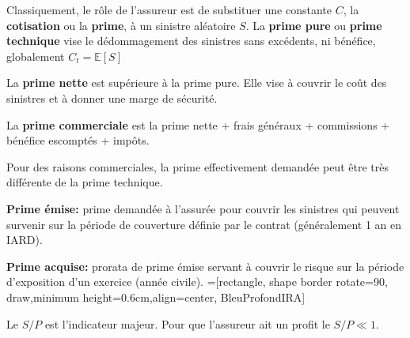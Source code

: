 \begin{f}
Classiquement, le rôle de l'assureur est de substituer une constante \(C\), la \textbf{cotisation} ou la \textbf{prime}, à un sinistre aléatoire \(S\).
La \textbf{prime pure} ou \textbf{prime technique} vise 
le dédommagement des sinistres sans excédents, ni bénéfice, globalement \(C_t = \mathbb{E}[S]\)
	
	La \textbf{prime nette} est supérieure à la prime pure. Elle vise à couvrir le coût des sinistres et à donner une marge de sécurité.
	
	La \textbf{prime commerciale} est la prime nette + frais généraux + commissions + bénéfice escomptés + impôts.
	
	Pour des raisons commerciales, la prime effectivement demandée peut être très différente de la prime technique.

	\textbf{Prime émise:} prime demandée à l'assurée pour couvrir les sinistres qui peuvent survenir sur la
période de couverture définie par le contrat (généralement 1 an en IARD).

\textbf{Prime acquise:} prorata de prime émise servant à couvrir le risque sur la période d'exposition
d'un exercice (année civile).
=[rectangle, shape border rotate=90, draw,minimum height=0.6cm,align=center, BleuProfondIRA]

\resizebox{\linewidth}{!}
{
}
Le \(S/P\) est l'indicateur majeur. Pour que l'assureur ait un profit le \(S/P\ll 1\). 
\end{f}

